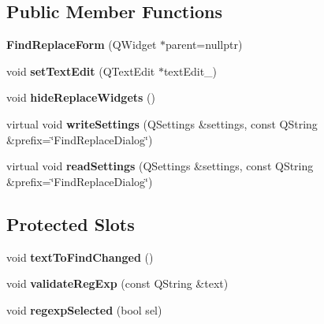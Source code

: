 \subsection*{Public Member Functions}
\begin{DoxyCompactItemize}
\item 
{\bfseries Find\+Replace\+Form} (Q\+Widget $\ast$parent=nullptr)\hypertarget{classFindReplaceForm_ae873449e492183b9c3ddee64b288e4e6}{}\label{classFindReplaceForm_ae873449e492183b9c3ddee64b288e4e6}

\item 
void {\bfseries set\+Text\+Edit} (Q\+Text\+Edit $\ast$text\+Edit\+\_\+)\hypertarget{classFindReplaceForm_ad621f91f15f0902a050c67e66c839d6f}{}\label{classFindReplaceForm_ad621f91f15f0902a050c67e66c839d6f}

\item 
void {\bfseries hide\+Replace\+Widgets} ()\hypertarget{classFindReplaceForm_acd7c42b7ef674ca414d0e47158fdad31}{}\label{classFindReplaceForm_acd7c42b7ef674ca414d0e47158fdad31}

\item 
virtual void {\bfseries write\+Settings} (Q\+Settings \&settings, const Q\+String \&prefix=\char`\"{}Find\+Replace\+Dialog\char`\"{})\hypertarget{classFindReplaceForm_a8746401be4fbab54b6019a76e05e7b43}{}\label{classFindReplaceForm_a8746401be4fbab54b6019a76e05e7b43}

\item 
virtual void {\bfseries read\+Settings} (Q\+Settings \&settings, const Q\+String \&prefix=\char`\"{}Find\+Replace\+Dialog\char`\"{})\hypertarget{classFindReplaceForm_a87e0f16b427e570ede2a219b16300c2a}{}\label{classFindReplaceForm_a87e0f16b427e570ede2a219b16300c2a}

\end{DoxyCompactItemize}
\subsection*{Protected Slots}
\begin{DoxyCompactItemize}
\item 
void {\bfseries text\+To\+Find\+Changed} ()\hypertarget{classFindReplaceForm_a0fd7fa8014c190857e5c3be4392fc96a}{}\label{classFindReplaceForm_a0fd7fa8014c190857e5c3be4392fc96a}

\item 
void {\bfseries validate\+Reg\+Exp} (const Q\+String \&text)\hypertarget{classFindReplaceForm_a2867ac36c3f8c9accb7f0c010ee74522}{}\label{classFindReplaceForm_a2867ac36c3f8c9accb7f0c010ee74522}

\item 
void {\bfseries regexp\+Selected} (bool sel)\hypertarget{classFindReplaceForm_acbde49b9b3e2efd6940f8d2e16b9172c}{}\label{classFindReplaceForm_acbde49b9b3e2efd6940f8d2e16b9172c}

\end{DoxyCompactItemize}
